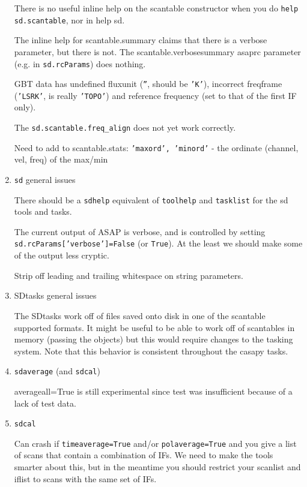 \begin{enumerate}
  There is no useful inline help on the scantable constructor
  when you do {\tt help sd.scantable}, nor in {help sd}.

  The inline help for scantable.summary claims that there is
  a verbose parameter, but there is not.  The scantable.verbosesummary
  asaprc parameter (e.g. in {\tt sd.rcParams}) does nothing.

  GBT data has undefined fluxunit ({\tt ''}, should be {\tt 'K'}), 
  incorrect freqframe ({\tt 'LSRK'}, is really {\tt 'TOPO'}) and reference
  frequency (set to that of the first IF only).


  The {\tt sd.scantable.freq\_align} does not yet work correctly.

  Need to add to scantable.stats:
      {\tt 'maxord', 'minord'} - the ordinate (channel, vel, freq) 
      of the max/min
  
\item {\tt sd} general issues

  There should be a {\tt sdhelp} equivalent of {\tt toolhelp}
  and {\tt tasklist} for the sd tools and tasks.

  The current output of ASAP is verbose, and is controlled by
  setting {\tt sd.rcParams['verbose']=False} (or {\tt True}).
  At the least we should make some of the output less cryptic.

  Strip off leading and trailing whitespace on string parameters.

\item SDtasks general issues

  The SDtasks work off of files saved onto disk in one of the 
  scantable supported formats.  It might be useful to be able to
  work off of scantables in memory (passing the objects) but this
  would require changes to the tasking system.  Note that this
  behavior is consistent throughout the casapy tasks.


\item {\tt sdaverage} (and {\tt sdcal})

  averageall=True is still experimental since test was insufficient 
  because of a lack of test data.

\item {\tt sdcal}

  Can crash if {\tt timeaverage=True} and/or {\tt polaverage=True}
  and you give a
  list of scans that contain a combination of IFs.  We need to make
  the tools smarter about this, but in the meantime you should restrict
  your scanlist and iflist to scans with the same set of IFs.


\end{enumerate}
